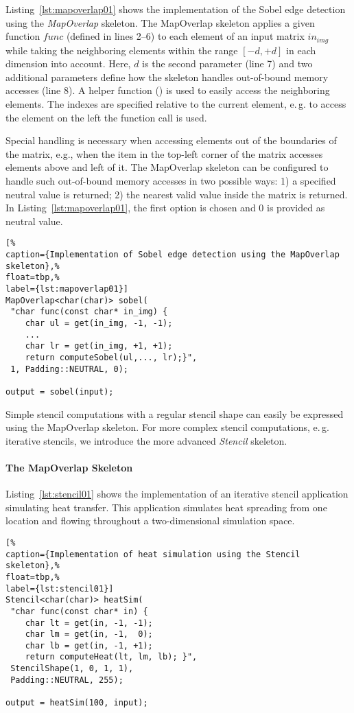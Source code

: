Listing~\ref{lst:mapoverlap01} shows the implementation of the Sobel edge detection using the \emph{MapOverlap} skeleton.
The MapOverlap skeleton applies a given function $func$ (defined in lines 2--6) to each element of an input matrix $in_{img}$ while taking the neighboring elements within the range $[-d, +d]$ in each dimension into account.
Here, $d$ is the second parameter (line 7) and two additional parameters define how the skeleton handles out-of-bound memory accesses (line 8).
A helper function () is used to easily access the neighboring elements.
The indexes are specified relative to the current element, e.\,g. to access the element on the left the function call  is used.

Special handling is necessary when accessing elements out of the boundaries of the matrix, e.g., when the item in the top-left corner of the matrix accesses elements above and left of it.
The MapOverlap skeleton can be configured to handle such out-of-bound memory accesses in two possible ways:
1) a specified neutral value is returned;
2) the nearest valid value inside the matrix is returned.
In Listing~\ref{lst:mapoverlap01}, the first option is chosen and $0$ is provided as neutral value.

\begin{lstlisting}[%
caption={Implementation of Sobel edge detection using the MapOverlap skeleton},%
float=tbp,%
label={lst:mapoverlap01}]
MapOverlap<char(char)> sobel(
 "char func(const char* in_img) {
    char ul = get(in_img, -1, -1);
    ...
    char lr = get(in_img, +1, +1);
    return computeSobel(ul,..., lr);}",
 1, Padding::NEUTRAL, 0);

output = sobel(input);
\end{lstlisting}

Simple stencil computations with a regular stencil shape can easily be expressed using the MapOverlap skeleton.
For more complex stencil computations, e.\,g. iterative stencils, we introduce the more advanced \emph{Stencil} skeleton.

\paragraph{The MapOverlap Skeleton}

Listing~\ref{lst:stencil01} shows the implementation of an iterative stencil application simulating heat transfer.
This application simulates heat spreading from one location and flowing throughout a two-dimensional simulation space.
\begin{lstlisting}[%
caption={Implementation of heat simulation using the Stencil skeleton},%
float=tbp,%
label={lst:stencil01}]
Stencil<char(char)> heatSim(
 "char func(const char* in) {
    char lt = get(in, -1, -1);
    char lm = get(in, -1,  0);
    char lb = get(in, -1, +1);
    return computeHeat(lt, lm, lb); }",
 StencilShape(1, 0, 1, 1),
 Padding::NEUTRAL, 255);

output = heatSim(100, input);
\end{lstlisting}


